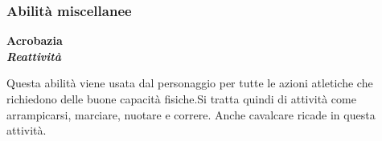 \documentclass[../manuale_main.tex]{subfiles}
\begin{document}


\clearpage

\subsubsection{Abilità miscellanee}



\begin{center}
\textbf{ \large{Acrobazia}}\\ \textit{\textbf{ Reattività}}
\\
\end{center}
  Questa abilità viene usata dal personaggio per tutte le azioni atletiche che richiedono delle buone capacità fisiche.Si tratta quindi di attività come arrampicarsi, marciare, nuotare e correre. Anche cavalcare ricade in questa attività. 
\end{document}
